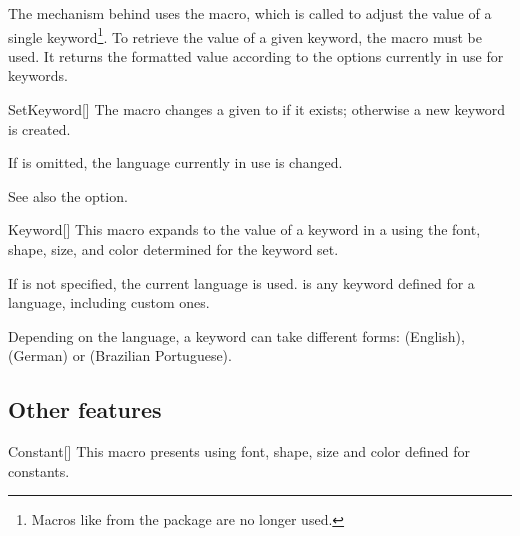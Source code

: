 \documentclass[a4paper, 11pt]{article}
\begin{document}
\begin{figure}
\end{figure}

The mechanism behind  uses the  macro, which is called to adjust the value of a single keyword\footnote{Macros like  from the  package are no longer used.}. To retrieve the value of a given keyword, the  macro must be used. It returns the formatted value according to the options currently in use for keywords.

\begin{macro}{SetKeyword}[]
    The macro  changes a given  to  if it exists; otherwise a new keyword is created.

    If  is omitted, the language currently in use is changed.

    See also the  option.
\end{macro}

\begin{macro}{Keyword}[]
    This macro expands to the value of a keyword in a  using the font, shape, size, and color determined for the keyword set.

    If  is not specified, the current language is used.  is any keyword defined for a language, including custom ones.
\end{macro}

\begin{tcblisting}{}
    Depending on the language, a keyword can take different forms:  (English),  (German) or  (Brazilian Portuguese).
\end{tcblisting}

\subsection{Other features}

\begin{macro}{Constant}[]
    This macro presents  using font, shape, size and color defined for constants.
\end{macro}
\end{document}
